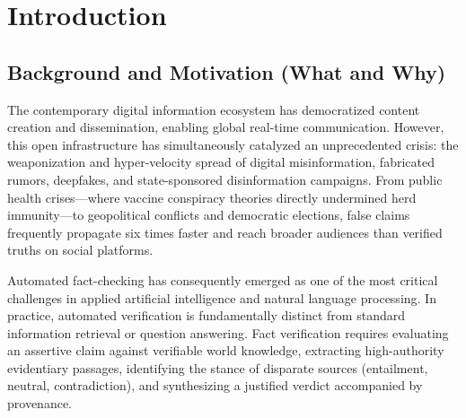 \documentclass[12pt,a4paper]{report}
\begin{document}
\begin{abstract}
Empirical evaluation on a curated 37-claim benchmark demonstrates that our full neuro-symbolic configuration (C4) achieves \textbf{89.2\% accuracy} [95\% Wilson CI: 75.3\%--95.7\%] with a Macro-F1 score of \textbf{0.8942}, drastically outperforming standalone NLI (56.8\%, $p = 0.0005$ via exact two-sided sign test) and closed-book LLMs (73.0\%). On the 100-sample Fake-Type benchmark, our hybrid classifier achieves \textbf{82.0\% accuracy} [95\% Wilson CI: 73.3\%--88.3\%], surpassing standalone linear classifiers (59.0\%). The system is wrapped into a responsive, production-ready Streamlit dashboard featuring live provenance inspection, confidence gauges, and offline cache replay.
\end{abstract}

\newpage
\tableofcontents
\newpage
\listoffigures
\newpage
\listoftables
\newpage

\setcounter{page}{1}

\chapter{Introduction}

\section{Background and Motivation (What and Why)}
The contemporary digital information ecosystem has democratized content creation and dissemination, enabling global real-time communication. However, this open infrastructure has simultaneously catalyzed an unprecedented crisis: the weaponization and hyper-velocity spread of digital misinformation, fabricated rumors, deepfakes, and state-sponsored disinformation campaigns. From public health crises—where vaccine conspiracy theories directly undermined herd immunity—to geopolitical conflicts and democratic elections, false claims frequently propagate six times faster and reach broader audiences than verified truths on social platforms.

Automated fact-checking has consequently emerged as one of the most critical challenges in applied artificial intelligence and natural language processing. In practice, automated verification is fundamentally distinct from standard information retrieval or question answering. Fact verification requires evaluating an assertive claim against verifiable world knowledge, extracting high-authority evidentiary passages, identifying the stance of disparate sources (entailment, neutral, contradiction), and synthesizing a justified verdict accompanied by provenance.
\end{document}
